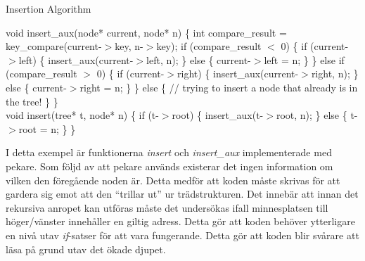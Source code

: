 \documentclass[a4paper]{article}
\begin{document}
			\begin{algorithm}
				\caption{Insertion Algorithm}
				\label{Insertioin Algorithm}
				\begin{algorithmic}[1]
					\State void insert\_aux(node* current, node* n) \{
						\State \hspace{0.5cm} int compare\_result = key\_compare(current-$>$key, n-$>$key);
						\State \hspace{0.5cm} if (compare\_result $<$ 0) \{
							\State \hspace{1cm} if (current-$>$left) \{
								\State \hspace{1.5cm} insert\_aux(current-$>$left, n);
							\State \hspace{1cm} \} else \{
								\State \hspace{1.5cm} current-$>$left = n;
							\State \hspace{1cm} \}
						\State \hspace{0.5cm} \} else if (compare\_result $>$ 0) \{
							\State \hspace{1cm} if (current-$>$right) \{
								\State \hspace{1.5cm} insert\_aux(current-$>$right, n);
							\State \hspace{1cm} \} else \{
								\State \hspace{1.5cm} current-$>$right = n;
							\State \hspace{1cm} \}
						\State \hspace{0.5cm} \} else \{
							\State \hspace{1cm} // trying to insert a node that already is in the tree!
						\State \hspace{0.5cm} \}
					\State \} \\

					\State void insert(tree* t, node* n) \{
						\State \hspace{0.5cm} if (t-$>$root) \{
							\State \hspace{1cm} insert\_aux(t-$>$root, n);
						\State \hspace{0.5cm} \} else \{
							\State \hspace{1cm} t-$>$root = n;
						\State \hspace{0.5cm} \}
					\State \}
				\end{algorithmic}
			\end{algorithm}

			I detta exempel är funktionerna \emph{insert} och \emph{insert\_aux} implementerade med pekare. Som följd av att pekare används existerar det ingen information om vilken den föregående noden är. Detta medför att koden måste skrivas för att gardera sig emot att den ``trillar ut'' ur trädstrukturen. Det innebär att innan det rekursiva anropet kan utföras måste det undersökas ifall minnesplatsen till höger/vänster innehåller en giltig adress. Detta gör att koden behöver ytterligare en nivå utav \emph{if}-satser för att vara fungerande. Detta gör att koden blir svårare att läsa på grund utav det ökade djupet.
\end{document}
